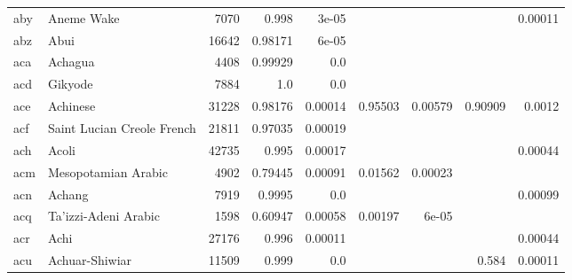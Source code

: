 \documentclass[11pt]{article}
\begin{document}
\begin{table*}[ht]
{\begin{tabular}{llrrrrrrr}
aby         & Aneme Wake         & 7070         & 0.998         & 3e-05         &          &          &          & 0.00011         \\

abz         & Abui         & 16642         & 0.98171         & 6e-05         &          &          &          &          \\

aca         & Achagua         & 4408         & 0.99929         & 0.0         &          &          &          &          \\

acd         & Gikyode         & 7884         & 1.0         & 0.0         &          &          &          &          \\

ace         & Achinese         & 31228         & 0.98176         & 0.00014         & 0.95503         & 0.00579         & 0.90909         & 0.0012         \\

acf         & Saint Lucian Creole French         & 21811         & 0.97035         & 0.00019         &          &          &          &          \\

ach         & Acoli         & 42735         & 0.995         & 0.00017         &          &          &          & 0.00044         \\

acm         & Mesopotamian Arabic         & 4902         & 0.79445         & 0.00091         & 0.01562         & 0.00023         &          &          \\

acn         & Achang         & 7919         & 0.9995         & 0.0         &          &          &          & 0.00099         \\

acq         & Ta'izzi-Adeni Arabic         & 1598         & 0.60947         & 0.00058         & 0.00197         & 6e-05         &          &          \\

acr         & Achi         & 27176         & 0.996         & 0.00011         &          &          &          & 0.00044         \\

acu         & Achuar-Shiwiar         & 11509         & 0.999         & 0.0         &          &          & 0.584         & 0.00011         \\


\end{tabular}}
\end{table*}
\end{document}
